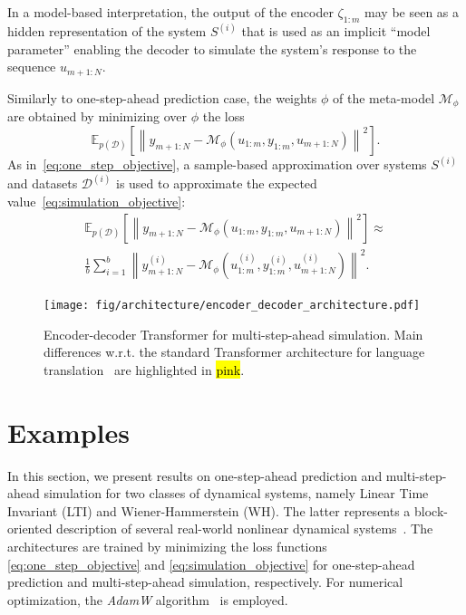 \documentclass{article}
\newcommand{\sys}{S}
\newcommand{\free}{\mathcal{M}}
\newcommand{\D}{\mathcal{D}}
\newcommand{\nsamp}{N}
\newcommand{\norm}[1]{\left\lVert#1\right\rVert}
\newcommand{\E}{\mathbb{E}}
\begin{document}
In a model-based interpretation, the output of the encoder $\zeta_{1:{m}}$ may be seen as a hidden  representation of the system $\sys^{(i)}$ that is used as an implicit ``model parameter'' enabling the decoder to simulate the system's response to the sequence $u_{m+1:\nsamp}$. 

Similarly to  one-step-ahead prediction case, the  weights $\phi$ of the meta-model $\free_{\phi}$ are obtained by minimizing over $\phi$  the loss 
\begin{equation}
	\label{eq:simulation_objective}
     \E_{p(\D)} 
    \left [ 
    \norm{y_{m+1:\nsamp} -  \free_\phi (u_{1:m}, y_{1:m}, u_{m+1:\nsamp})
    }^2
    \right ].
\end{equation}
As in~\eqref{eq:one_step_objective}, a sample-based approximation over systems $\sys^{(i)}$ 
and  datasets $\D^{(i)}$  is used to approximate the expected value~\eqref{eq:simulation_objective}:
\begin{multline}
	\label{eq:simulation_objective_samples}
     \E_{p(\D)} 
    \left [ 
    \norm{y_{m+1:\nsamp} -  \free_\phi (u_{1:m}, y_{1:m}, u_{m+1:\nsamp})
    }^2
    \right ]
    \approx \\
    \frac{1}{b}
    \sum_{i=1}^b
    \norm{y_{m+1:\nsamp}^{(i)} - \free_\phi (u_{1:m}^{(i)}, y_{1:m}^{(i)}, u_{m+1:\nsamp}^{(i)})}^2
    .
\end{multline}


\begin{figure}[!bt]
\texttt{[image: fig/architecture/encoder\_decoder\_architecture.pdf]}
\caption{Encoder-decoder Transformer  for multi-step-ahead simulation. Main differences w.r.t. the standard Transformer architecture for language translation~\cite{vaswani2017attention} are highlighted in \hl{pink}.}
\label{fig:encoder_decoder_arch}
\end{figure}


\section{Examples}
\label{sec:examples}

In this section, we present results on  one-step-ahead prediction and multi-step-ahead simulation for two classes of dynamical systems, namely
Linear Time Invariant (LTI) and Wiener-Hammerstein (WH). The latter represents a block-oriented description of several real-world nonlinear dynamical systems~\cite{giri2010block}.  
The architectures are trained by minimizing the loss functions 
\eqref{eq:one_step_objective} and \eqref{eq:simulation_objective} for one-step-ahead prediction and multi-step-ahead simulation, respectively.
For numerical optimization, the \emph{AdamW} algorithm~\cite{loshchilov2017decoupled} is employed. %
\end{document}
